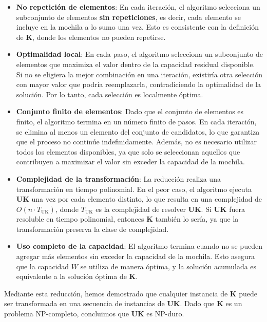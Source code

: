 \documentclass{report}
\begin{document}
\begin{itemize}
	\item \textbf{No repetición de elementos}: En cada iteración, el algoritmo selecciona un subconjunto de elementos \textbf{sin repeticiones}, es decir, cada elemento se incluye en la mochila a lo sumo una vez. Esto es consistente con la definición de \textbf{K}, donde los elementos no pueden repetirse.
	
	\item \textbf{Optimalidad local}: En cada paso, el algoritmo selecciona un subconjunto de elementos que maximiza el valor dentro de la capacidad residual disponible. Si no se eligiera la mejor combinación en una iteración, existiría otra selección con mayor valor que podría reemplazarla, contradiciendo la optimalidad de la solución. Por lo tanto, cada selección es localmente óptima.
	
	\item \textbf{Conjunto finito de elementos}: Dado que el conjunto de elementos es finito, el algoritmo termina en un número finito de pasos. En cada iteración, se elimina al menos un elemento del conjunto de candidatos, lo que garantiza que el proceso no continúe indefinidamente. Además, no es necesario utilizar todos los elementos disponibles, ya que solo se seleccionan aquellos que contribuyen a maximizar el valor sin exceder la capacidad de la mochila.
	
	\item \textbf{Complejidad de la transformación}: La reducción realiza una transformación en tiempo polinomial. En el peor caso, el algoritmo ejecuta \textbf{UK} una vez por cada elemento distinto, lo que resulta en una complejidad de \( O(n \cdot T_{\text{UK}}) \), donde \( T_{\text{UK}} \) es la complejidad de resolver \textbf{UK}. Si \textbf{UK} fuera resoluble en tiempo polinomial, entonces \textbf{K} también lo sería, ya que la transformación preserva la clase de complejidad.
	
	\item \textbf{Uso completo de la capacidad}: El algoritmo termina cuando no se pueden agregar más elementos sin exceder la capacidad de la mochila. Esto asegura que la capacidad \( W \) se utiliza de manera óptima, y la solución acumulada es equivalente a la solución óptima de \textbf{K}.
\end{itemize}
Mediante esta reducción, hemos demostrado que cualquier instancia de \textbf{K} puede ser transformada en una secuencia de instancias de \textbf{UK}. Dado que \textbf{K} es un problema NP-completo, concluimos que \textbf{UK} es NP-duro.
\end{document}
